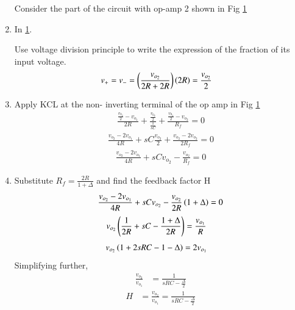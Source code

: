 \begin{enumerate}[label=\thesubsection.\arabic*.,ref=\thesubsection.\theenumi]
Consider the part of the circuit with op-amp 2 shown in Fig \ref{fig:es17btech11009_fig3}
\renewcommand{\thefigure}{\theenumi.\arabic{figure}}
\begin{figure}[!ht]
	\begin{center}
		\resizebox{\columnwidth}{!}{}
	\end{center}
\caption{}
\label{fig:es17btech11009_fig3}
\end{figure}

\item
In \ref{fig:es17btech11009_fig3}.

Use voltage division principle to write the expression of the fraction of its input voltage.
\begin{align}
v_{+}&= v_{-}=\left(\frac{v_{o_2}}{2R + 2R}\right)\left(2R\right) = \frac{v_{o_2}}{2}
\end{align}
\item
Apply KCL at the non- inverting terminal of the op amp in Fig \ref{fig:es17btech11009_fig3}
\begin{align}
\frac{\frac{v_{0_2}}{2} - v_{o_1}}{2R} + \frac{\frac{v_{0_2}}{2}}{\frac{1}{sC}} + \frac{\frac{v_{0_2}}{2} - v_{o_2}}{R_{f}} =0
\end{align}
\begin{align}
\frac{v_{o_2} - 2v_{o_1}}{4R} + sC\frac{v_{o_2}}{2} + \frac{v_{o_2} - 2v_{o_2}}{2R_{f}} = 0
\end{align}
\begin{align}
\frac{v_{o_2} - 2v_{o_1}}{4R} + sCv_{o_2} -  \frac{v_{o_2}}{R_{f}} = 0
\end{align}
\item
Substitute $R_{f} = \frac{2R}{1 + \Delta}$ and find the feedback factor H
\begin{align}
\frac{v_{o_2} - 2v_{o_1}}{4R} + sCv_{o_2} -  \frac{v_{o_2}}{2R}\left(1 + \Delta\right) = 0
\end{align}
\begin{align}
v_{o_2}\left(\frac{1}{2R} + sC - \frac{1+ \Delta}{2R}\right)&= \frac{v_{o_1}}{R} 
\end{align}
\begin{align}
v_{o_2}\left(1 + 2sRC -1 - \Delta\right)&= 2v_{o_1}
\end{align}
Simplifying further,
\begin{align}
    \frac{v_{o_2}}{v_{o_1}}&= \frac{1}{sRC - \frac{\Delta}{2}}
\end{align}
\begin{align}
    H &=\frac{v_{o_2}}{v_{o_1}}= \frac{1}{sRC - \frac{\Delta}{2}}
    \label{eq:es17btech11009_H}
\end{align}


\end{enumerate}
